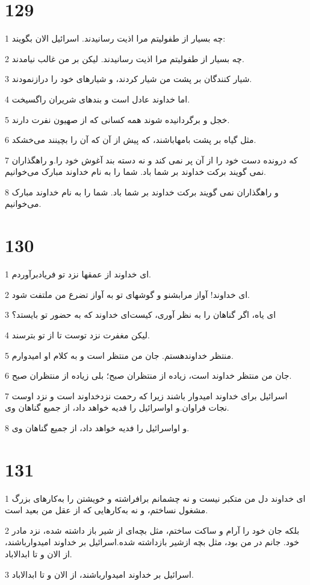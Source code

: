 \chapter{129}

\par 1 چه بسیار از طفولیتم مرا اذیت رسانیدند. اسرائیل الان بگویند:
\par 2 چه بسیار از طفولیتم مرا اذیت رسانیدند. لیکن بر من غالب نیامدند.
\par 3 شیار کنندگان بر پشت من شیار کردند، و شیارهای خود را درازنمودند.
\par 4 اما خداوند عادل است و بندهای شریران راگسیخت.
\par 5 خجل و برگردانیده شوند همه کسانی که از صهیون نفرت دارند.
\par 6 مثل گیاه بر پشت بامهاباشند، که پیش از آن که آن را بچینند می‌خشکد.
\par 7 که درونده دست خود را از آن پر نمی کند و نه دسته بند آغوش خود را.و راهگذاران نمی گویند برکت خداوند بر شما باد. شما را به نام خداوند مبارک می‌خوانیم.
\par 8 و راهگذاران نمی گویند برکت خداوند بر شما باد. شما را به نام خداوند مبارک می‌خوانیم.
 
\chapter{130}

\par 1 ای خداوند از عمقها نزد تو فریادبرآوردم.
\par 2 ‌ای خداوند! آواز مرابشنو و گوشهای تو به آواز تضرع من ملتفت شود.
\par 3 ‌ای یاه، اگر گناهان را به نظر آوری، کیست‌ای خداوند که به حضور تو بایستد؟
\par 4 لیکن مغفرت نزد توست تا از تو بترسند.
\par 5 منتظر خداوندهستم. جان من منتظر است و به کلام او امیدوارم.
\par 6 جان من منتظر خداوند است، زیاده از منتظران صبح؛ بلی زیاده از منتظران صبح.
\par 7 اسرائیل برای خداوند امیدوار باشند زیرا که رحمت نزدخداوند است و نزد اوست نجات فراوان.و اواسرائیل را فدیه خواهد داد، از جمیع گناهان وی.
\par 8 و اواسرائیل را فدیه خواهد داد، از جمیع گناهان وی.
 
\chapter{131}

\par 1 ای خداوند دل من متکبر نیست و نه چشمانم برافراشته و خویشتن را به‌کارهای بزرگ مشغول نساختم، و نه به‌کارهایی که از عقل من بعید است.
\par 2 بلکه جان خود را آرام و ساکت ساختم، مثل بچه‌ای از شیر باز داشته شده، نزد مادر خود. جانم در من بود، مثل بچه ازشیر بازداشته شده.اسرائیل بر خداوند امیدوارباشند، از الان و تا ابدالاباد.
\par 3 اسرائیل بر خداوند امیدوارباشند، از الان و تا ابدالاباد.
 
